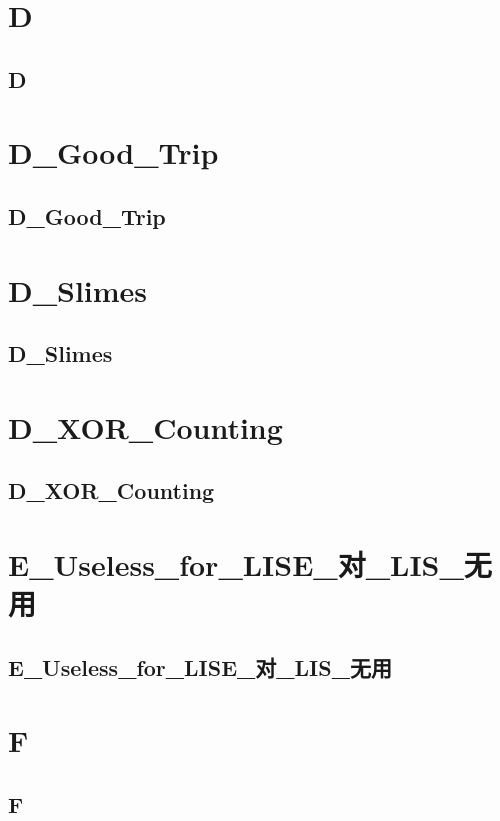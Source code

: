 \section{D}
\subsection{D}
\raggedbottom
\hrulefill

\section{D_Good_Trip}
\subsection{D_Good_Trip}
\raggedbottom
\hrulefill

\section{D_Slimes}
\subsection{D_Slimes}
\raggedbottom
\hrulefill

\section{D_XOR_Counting}
\subsection{D_XOR_Counting}
\raggedbottom
\hrulefill

\section{E_Useless_for_LISE_对_LIS_无用}
\subsection{E_Useless_for_LISE_对_LIS_无用}
\raggedbottom
\hrulefill

\section{F}
\subsection{F}
\raggedbottom
\hrulefill


